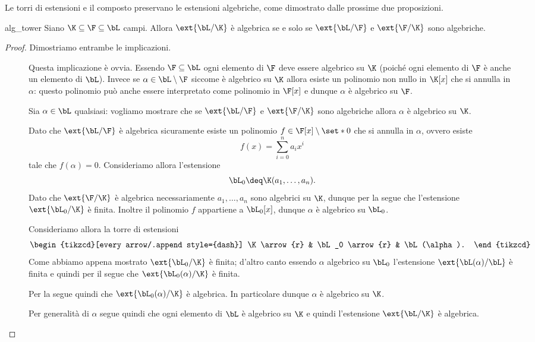 Le torri di estensioni e il composto preservano le estensioni algebriche, come dimostrato dalle prossime due proposizioni.

\begin{proposition}
    {}{alg_tower}
    Siano $\K \subseteq \F \subseteq \bL$ campi. Allora $\ext{\bL / \K}$ è algebrica se e solo se $\ext{\bL / \F}$ e $\ext{\F / \K}$ sono algebriche.
\end{proposition}
\begin{proof}
    Dimostriamo entrambe le implicazioni.
    \begin{description}
        \item[\boximpl] Questa implicazione è ovvia. Essendo $\F \subseteq \bL$ ogni elemento di $\F$ deve essere algebrico su $\K$ (poiché ogni elemento di $\F$ è anche un elemento di $\bL$). Invece se $\alpha \in \bL \setminus \F$ siccome è algebrico su $\K$ allora esiste un polinomio non nullo in $\K[x]$ che si annulla in $\alpha$: questo polinomio può anche essere interpretato come polinomio in $\F[x]$ e dunque $\alpha$ è algebrico su $\F$.
        \item[\boximplby] Sia $\alpha \in \bL$ qualsiasi: vogliamo mostrare che se $\ext{\bL / \F}$ e $\ext{\F / \K}$ sono algebriche allora $\alpha$ è algebrico su $\K$.
        
        Dato che $\ext{\bL / \F}$ è algebrica sicuramente esiste un polinomio $f \in \F[x] \setminus \set*{0}$ che si annulla in $\alpha$, ovvero esiste \[
            f(x) = \sum_{i=0}^n a_{i}x^i
        \] tale che $f(\alpha) = 0$. Consideriamo allora l'estensione \[
            \bL_0 \deq \K(a_1, \dots, a_n).
        \] Dato che $\ext{\F / \K}$ è algebrica necessariamente $a_1, \dots, a_n$ sono algebrici su $\K$, dunque per la  segue che l'estensione $\ext{\bL_0 / \K}$ è finita. Inoltre il polinomio $f$ appartiene a $\bL_0[x]$, dunque $\alpha$ è algebrico su $\bL_0$.   
        
        Consideriamo allora la torre di estensioni \[
            \begin{tikzcd}[every arrow/.append style={dash}]
                \K \arrow{r} & \bL_0 \arrow{r} & \bL(\alpha).
            \end{tikzcd}
        \] Come abbiamo appena mostrato $\ext{\bL_0 / \K}$ è finita; d'altro canto essendo $\alpha$ algebrico su $\bL_0$ l'estensione $\ext{\bL(\alpha) / \bL}$ è finita e quindi per il  segue che $\ext{\bL_0(\alpha) / \K}$ è finita.

        Per la  segue quindi che $\ext{\bL_0(\alpha) / \K}$ è algebrica. In particolare dunque $\alpha$ è algebrico su $\K$.
        
        Per generalità di $\alpha$ segue quindi che ogni elemento di $\bL$ è algebrico su $\K$ e quindi l'estensione $\ext{\bL / \K}$ è algebrica. \qedhere
    \end{description}
\end{proof}

